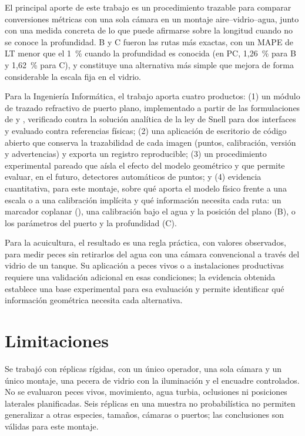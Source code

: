 El principal aporte de este trabajo es un procedimiento trazable para comparar conversiones métricas con una sola cámara en un montaje aire--vidrio--agua, junto con una medida concreta de lo que puede afirmarse sobre la longitud cuando no se conoce la profundidad. B y C fueron las rutas más exactas, con un MAPE de LT menor que el 1~\% cuando la profundidad es conocida (en PC, 1,26~\% para B y 1,62~\% para C), y \Aprime{} constituye una alternativa más simple que mejora de forma considerable la escala fija en el vidrio.

Para la Ingeniería Informática, el trabajo aporta cuatro productos: (1) un módulo de trazado refractivo de puerto plano, implementado a partir de las formulaciones de \textcite{Agrawal2012} y \textcite{Treibitz2012}, verificado contra la solución analítica de la ley de Snell para dos interfaces y evaluado contra referencias físicas; (2) una aplicación de escritorio de código abierto que conserva la trazabilidad de cada imagen (puntos, calibración, versión y advertencias) y exporta un registro reproducible; (3) un procedimiento experimental pareado que aísla el efecto del modelo geométrico y que permite evaluar, en el futuro, detectores automáticos de puntos; y (4) evidencia cuantitativa, para este montaje, sobre qué aporta el modelo físico frente a una escala o a una calibración implícita y qué información necesita cada ruta: un marcador coplanar (\Aprime), una calibración bajo el agua y la posición del plano (B), o los parámetros del puerto y la profundidad (C).

Para la acuicultura, el resultado es una regla práctica, con valores observados, para medir peces sin retirarlos del agua con una cámara convencional a través del vidrio de un tanque. Su aplicación a peces vivos o a instalaciones productivas requiere una validación adicional en esas condiciones; la evidencia obtenida establece una base experimental para esa evaluación y permite identificar qué información geométrica necesita cada alternativa.

\section{Limitaciones}
\label{sec:limitaciones}

Se trabajó con réplicas rígidas, con un único operador, una sola cámara y un único montaje, una pecera de vidrio con la iluminación y el encuadre controlados. No se evaluaron peces vivos, movimiento, agua turbia, oclusiones ni posiciones laterales planificadas. Seis réplicas en una muestra no probabilística no permiten generalizar a otras especies, tamaños, cámaras o puertos; las conclusiones son válidas para este montaje.

